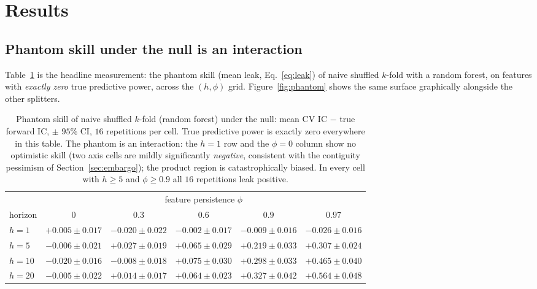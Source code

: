 \documentclass[11pt]{article}
\begin{document}
\section{Results}

\subsection{Phantom skill under the null is an interaction}
\label{sec:interaction}

Table~\ref{tab:interaction} is the headline measurement: the phantom skill
(mean leak, Eq.~\eqref{eq:leak}) of naive shuffled $k$-fold with a random
forest, on features with \emph{exactly zero} true predictive power, across
the $(h, \phi)$ grid. Figure~\ref{fig:phantom} shows the same surface
graphically alongside the other splitters.

\begin{table}[t]
\centering
\caption{Phantom skill of naive shuffled $k$-fold (random forest) under the
null: mean CV IC $-$ true forward IC, $\pm$ $95\%$ CI, $16$ repetitions per
cell. True predictive power is exactly zero everywhere in this table. The
phantom is an interaction: the $h=1$ row and the $\phi=0$ column show no
optimistic skill (two axis cells are mildly significantly \emph{negative},
consistent with the contiguity pessimism of Section~\ref{sec:embargo});
the product region is catastrophically biased. In every
cell with $h \ge 5$ and $\phi \ge 0.9$ all $16$ repetitions leak positive.}
\label{tab:interaction}
\small
\begin{tabular}{lccccc}
\toprule
& \multicolumn{5}{c}{feature persistence $\phi$}\\
\cmidrule(lr){2-6}
horizon & $0$ & $0.3$ & $0.6$ & $0.9$ & $0.97$ \\
\midrule
$h=1$  & $+0.005 \pm 0.017$ & $-0.020 \pm 0.022$ & $-0.002 \pm 0.017$ & $-0.009 \pm 0.016$ & $-0.026 \pm 0.016$ \\
$h=5$  & $-0.006 \pm 0.021$ & $+0.027 \pm 0.019$ & $+0.065 \pm 0.029$ & $+0.219 \pm 0.033$ & $+0.307 \pm 0.024$ \\
$h=10$ & $-0.020 \pm 0.016$ & $-0.008 \pm 0.018$ & $+0.075 \pm 0.030$ & $+0.298 \pm 0.033$ & $+0.465 \pm 0.040$ \\
$h=20$ & $-0.005 \pm 0.022$ & $+0.014 \pm 0.017$ & $+0.064 \pm 0.023$ & $+0.327 \pm 0.042$ & $+0.564 \pm 0.048$ \\
\bottomrule
\end{tabular}
\end{table}
\end{document}
